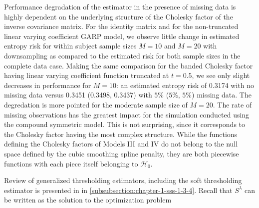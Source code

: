 \documentclass[12pt]{article}
\newcommand*\needsparaphrased{\color{red}}
\theoremstyle{definition}
\begin{document}
\bigskip

Performance degradation of the estimator in the presence of missing data is highly dependent on the underlying structure of the Cholesky factor of the inverse covariance matrix. For the identity matrix and for the non-truncated linear varying coefficient GARP model, we observe little change in estimated entropy risk for within subject sample sizes $M = 10$ and $M = 20$ with downsampling as compared to the estimated risk for both sample sizes in the complete data case. Making the same comparison for the banded Cholesky factor having linear varying coefficient function truncated at $t = 0.5$, we see only slight decreases in performance for $M = 10$: an estimated entropy risk of 0.3174  with no missing data versus 0.3451 (0.3498, 0.3437) with $5\%$ ($5\%$, $5\%$) missing data. The degredation is more pointed for the moderate sample size of $M = 20$. The rate of missing observations has the greatest impact for the simulation conducted using the compound symmetric model. This is not surprising, since it corresponds to the Cholesky factor having the most complex structure. While the functions defining the Cholesky factors of Models III and IV do not belong to the null space defined by the cubic smoothing spline penalty, they are both piecewise functions with each piece itself belonging to $\mathcal{H}_0$.

\bigskip

{\needsparaphrased{Should the discussion that immediately follows be moved to after the tables containing non-appendix numerical results?}}

\bigskip

{\needsparaphrased{Should the discussion of study \# 1 be with the tablse for study 1, separate from the discussion + tables for study 2?}}

\bigskip

Review of generalized thresholding estimators, including the soft thresholding estimator is presented in in \ref{subsubsection:chapter-1-sss-1-3-4}. Recall that  $S^\lambda$ can be written as the solution to the optimization problem
\end{document}
